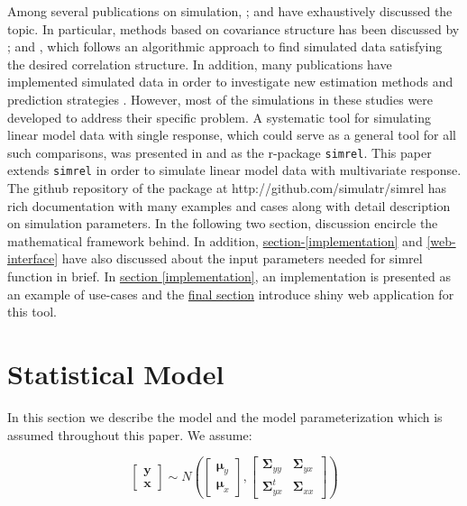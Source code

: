 \documentclass[review]{elsarticle}
\theoremstyle{definition}
\theoremstyle{definition}
\theoremstyle{definition}
\theoremstyle{remark}
\begin{document}
Among several publications on simulation,
\citet{johnson2013multivariate}; \citet{ripley2009stochastic} and
\citet{gamerman2006markov} have exhaustively discussed the topic. In
particular, methods based on covariance structure has been discussed by
\citet{arteaga2010simulate}; \citet{arteaga2013building} and
\citet{camacho2017generation}, which follows an algorithmic approach to
find simulated data satisfying the desired correlation structure. In
addition, many publications have implemented simulated data in order to
investigate new estimation methods and prediction strategies
\citep[see:][]{cook2015simultaneous, cook2013envelopes, helland2012near}.
However, most of the simulations in these studies were developed to
address their specific problem. A systematic tool for simulating linear
model data with single response, which could serve as a general tool for
all such comparisons, was presented in \citet{saebo2015simrel} and as
the r-package \texttt{simrel}. This paper extends \texttt{simrel} in
order to simulate linear model data with multivariate response. The
github repository of the package at http://github.com/simulatr/simrel
has rich documentation with many examples and cases along with detail
description on simulation parameters. In the following two section,
discussion encircle the mathematical framework behind. In addition,
\protect\hyperlink{implementation}{section-\ref{implementation}} and
\protect\hyperlink{web-interface}{\ref{web-interface}} have also
discussed about the input parameters needed for simrel function in
brief. In \protect\hyperlink{implementation}{section
\ref{implementation}}, an implementation is presented as an example of
use-cases and the \protect\hyperlink{web-interface}{final section}
introduce shiny web application for this tool.

\section{Statistical Model}\label{statistical-model}

In this section we describe the model and the model parameterization
which is assumed throughout this paper. We assume:

\begin{equation}
  \begin{bmatrix}\mathbf{y}\\ \mathbf{x}\end{bmatrix} \sim N
  \left(
    \begin{bmatrix}
      \boldsymbol{\mu}_y \\
      \boldsymbol{\mu}_x
    \end{bmatrix},
    \begin{bmatrix}
      \boldsymbol{\Sigma}_{yy} & \boldsymbol{\Sigma}_{yx} \\
      \boldsymbol{\Sigma}_{yx}^t & \boldsymbol{\Sigma}_{xx}
    \end{bmatrix}
  \right)
  \label{eq:rand-reg-model}
\end{equation}
\end{document}
